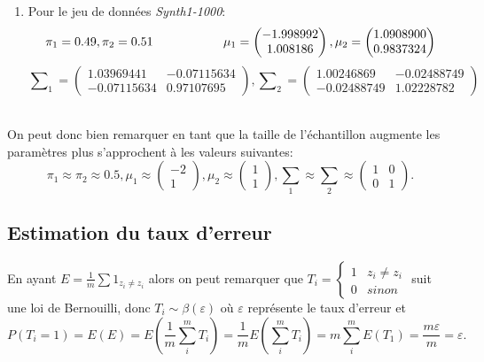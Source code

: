 \documentclass[a4paper,11pt]{article}
\begin{document}
\begin{enumerate}
  \item Pour le jeu de données \textit{Synth1-1000}:
  \[ \pi_1  = 0.49, \pi_2  = 0.51 \hspace*{2cm} 
    \mu_1  = \begin{pmatrix} -1.998992 \\ 1.008186 \end{pmatrix},
     \mu_2  = \begin{pmatrix} 1.0908900 \\ 0.9837324 \end{pmatrix}\]
  \[ \sum\nolimits_1 = \begin{pmatrix}
   1.03969441  & -0.07115634 \\
   -0.07115634 & 0.97107695 
  \end{pmatrix},
  \sum\nolimits_2 = \begin{pmatrix}
  1.00246869  & -0.02488749 \\
  -0.02488749 & 1.02228782 
  \end{pmatrix}\]\\
  
\end{enumerate}
On peut donc bien remarquer en tant que la taille de l'échantillon augmente les paramètres plus s’approchent à les valeurs suivantes:  
\[\pi_1 \approx  \pi_2 \approx 0.5,
\mu_1 \approx  \begin{pmatrix} -2 \\ 1 \end{pmatrix}, \mu_2 \approx  \begin{pmatrix} 1 \\ 1 \end{pmatrix}
, \sum_1 \approx  \sum_2 \approx  \begin{pmatrix}
  1  & 0 \\
  0 & 1  
\end{pmatrix}.\]


\subsection*{Estimation du taux d’erreur}
En ayant $E=\frac{1}{m}\sum 1_{z_i\ne z_i}$ alors on peut remarquer que 
   $T_i = \left\{
     \begin{array}{lr}
       1 & z_i\ne z_i\\
       0 & sinon
     \end{array}
   \right.$
suit une loi de Bernouilli, donc $T_i\sim\mathcal{\beta}(\varepsilon)$ où $\varepsilon$ représente le taux d'erreur et \[P(T_i=1)=E(E)=E(\frac{1}{m}\overset{m}{\underset{i}{\sum}}T_i)=\frac{1}{m}E(\overset{m}{\underset{i}{\sum}}{T_i})=m\overset{m}{\underset{i}{\sum}} E(T_1)=\frac{m \varepsilon}{m}=\varepsilon.\]
\end{document}
